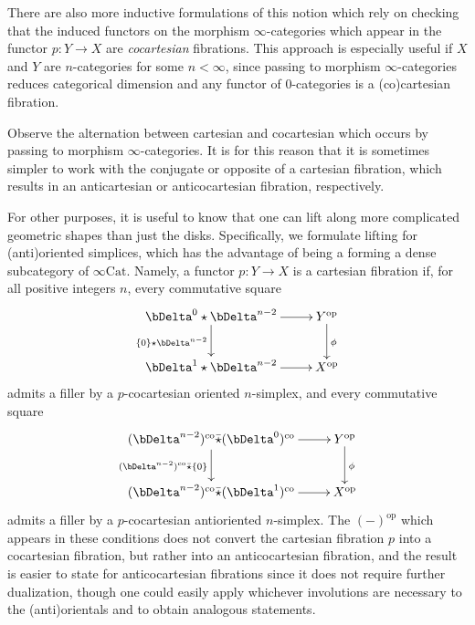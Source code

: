 \documentclass[10pt,oneside]{article}
\numberwithin{equation}{section} %
\numberwithin{figure}{section} %
\theoremstyle{plain}
\theoremstyle{definition}
\newcommand{\op}{\mathrm{op}}
\newcommand{\co}{\mathrm{co}}
\newcommand{\Cat}{\mathrm{Cat}}
\begin{document}
There are also more inductive formulations of this notion which rely on checking that the induced functors on the morphism $\infty$-categories which appear in the functor $p:Y\to X$ are {\em cocartesian} fibrations.
This approach is especially useful if $X$ and $Y$ are $n$-categories for some $n<\infty$, since passing to morphism $\infty$-categories reduces categorical dimension and any functor of $0$-categories is a (co)cartesian fibration.

Observe the alternation between cartesian and cocartesian which occurs by passing to morphism $\infty$-categories.
It is for this reason that it is sometimes simpler to work with the conjugate or opposite of a cartesian fibration, which results in an anticartesian or anticocartesian fibration, respectively.

For other purposes, it is useful to know that one can lift along more complicated geometric shapes than just the disks.
Specifically, we formulate lifting for (anti)oriented simplices, which has the advantage of being a forming a dense subcategory of $\infty\Cat$.
Namely, a functor $p:Y\to X$ is a cartesian fibration if, for all positive integers $n$, every commutative square
\begin{equation}
\begin{xy}
\xymatrix{
\bDelta^0 \star \bDelta^{n-2} \ar[d]_{\{0\}\star \bDelta^{n-2}} \ar[r]
& Y^{\op} \ar[d]^\phi
\\ 
\bDelta^1 \star \bDelta^{n-2} \ar[r] & X^{\op}
}
\end{xy}\end{equation}
admits a filler by a $p$-cocartesian oriented $n$-simplex, and every commutative square
\begin{equation}
\begin{xy}
\xymatrix{(\bDelta^{n-2})^\co \bar{\star} (\bDelta^0)^\co \ar[d]_{(\bDelta^{n-2})^\co \bar{\star} \{0\}} \ar[r]
& Y^{\op} \ar[d]^\phi
\\ 
(\bDelta^{n-2})^\co \bar{\star} (\bDelta^1)^\co \ar[r] & X^{\op}
}
\end{xy}\end{equation}
admits a filler by a $p$-cocartesian antioriented $n$-simplex.
The $(-)^\op$ which appears in these conditions does not convert the cartesian fibration $p$ into a cocartesian fibration, but rather into an anticocartesian fibration, and the result is easier to state for anticocartesian fibrations since it does not require further dualization, though one could easily apply whichever involutions are necessary to the (anti)orientals and to obtain analogous statements.
\end{document}
